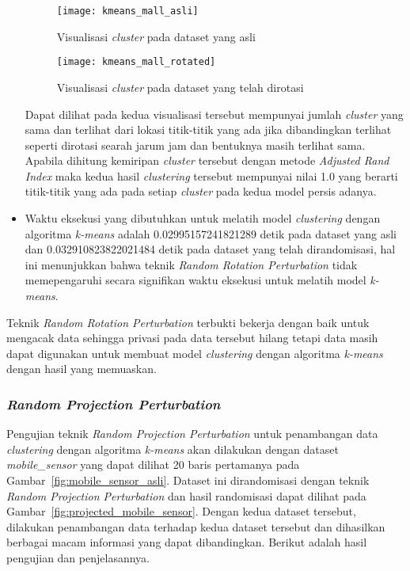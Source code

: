 \begin{itemize}
	\begin{figure}
		\centering
		\texttt{[image: kmeans\_mall\_asli]}
		\caption{Visualisasi \textit{cluster} pada dataset yang asli}
		\label{fig:kmeans_mall_asli}
	\end{figure}
	
	\begin{figure}
		\centering
		\texttt{[image: kmeans\_mall\_rotated]}
		\caption{Visualisasi \textit{cluster} pada dataset yang telah dirotasi}
		\label{fig:kmeans_mall_rotated}
	\end{figure}

	Dapat dilihat pada kedua visualisasi tersebut mempunyai jumlah \textit{cluster} yang sama dan terlihat dari lokasi titik-titik yang ada jika dibandingkan terlihat seperti dirotasi searah jarum jam dan bentuknya masih terlihat sama. Apabila dihitung kemiripan \textit{cluster} tersebut dengan metode \textit{Adjusted Rand Index} maka kedua hasil \textit{clustering} tersebut mempunyai nilai 1.0 yang berarti titik-titik yang ada pada setiap \textit{cluster} pada kedua model persis adanya.
	
	\item Waktu eksekusi yang dibutuhkan untuk melatih model \textit{clustering} dengan algoritma \textit{k-means} adalah 0.02995157241821289 detik pada dataset yang asli dan 0.032910823822021484 detik pada dataset yang telah dirandomisasi, hal ini menunjukkan bahwa teknik \textit{Random Rotation Perturbation} tidak memepengaruhi secara signifikan waktu eksekusi untuk melatih model \textit{k-means}.
\end{itemize}

Teknik \textit{Random Rotation Perturbation} terbukti bekerja dengan baik untuk mengacak data sehingga privasi pada data tersebut hilang tetapi data masih dapat digunakan untuk membuat model \textit{clustering} dengan algoritma \textit{k-means} dengan hasil yang memuaskan. 

\subsubsection{\textit{Random Projection Perturbation}}
\label{subsubsec:pengujian-clustering-rpp}

Pengujian teknik \textit{Random Projection Perturbation} untuk penambangan data \textit{clustering} dengan algoritma \textit{k-means} akan dilakukan dengan dataset \textit{mobile\_sensor} yang dapat dilihat 20 baris pertamanya pada Gambar~\ref{fig:mobile_sensor_asli}. Dataset ini dirandomisasi dengan teknik \textit{Random Projection Perturbation} dan hasil randomisasi dapat dilihat pada Gambar~\ref{fig:projected_mobile_sensor}. Dengan kedua dataset tersebut, dilakukan penambangan data terhadap kedua dataset tersebut dan dihasilkan berbagai macam informasi yang dapat dibandingkan. Berikut adalah hasil pengujian dan penjelasannya.

